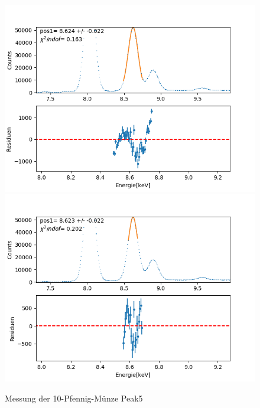 \documentclass[12pt,a4paper]{article}
\begin{document}
\begin{figure}[H]
\centering
\includegraphics[scale=0.49]{Bilder/roentgen_spektren/pfennig/pfen5_1.png}
\includegraphics[scale=0.49]{Bilder/roentgen_spektren/pfennig/pfen5_2.png}
\caption{Messung der 10-Pfennig-Münze Peak5}
\end{figure}
\end{document}

